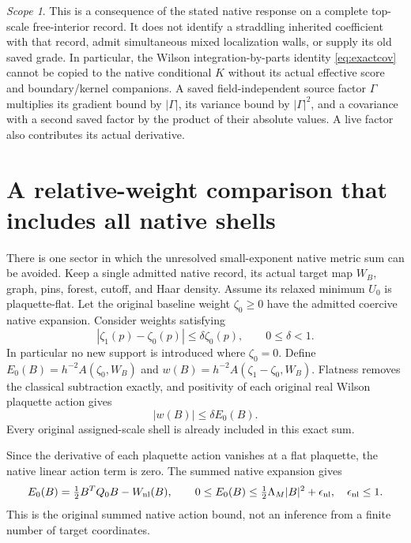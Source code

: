 \documentclass[11pt,letterpaper]{article}
\numberwithin{equation}{section}
\theoremstyle{plain}
\theoremstyle{remark}
\newtheorem{remark}[theorem]{Scope}
\begin{document}
\begin{remark}
This is a consequence of the stated native response on a complete top-scale
free-interior record. It does not identify a straddling inherited coefficient
with that record, admit simultaneous mixed localization walls, or supply its
old saved grade. In particular, the Wilson integration-by-parts identity
\eqref{eq:exactcov} cannot be copied to the native conditional $K$ without its
actual effective score and boundary/kernel companions. A saved
field-independent source factor $\Gamma$ multiplies its gradient bound by
$|\Gamma|$, its variance bound by $|\Gamma|^2$, and a covariance with a second
saved factor by the product of their absolute values. A live factor also
contributes its actual derivative.
\end{remark}

\section{A relative-weight comparison that includes all native shells}
\label{sec:flat}

There is one sector in which the unresolved small-exponent native metric sum
can be avoided. Keep a single admitted native record, its actual target map
$W_B$, graph, pins, forest, cutoff, and Haar density. Assume its relaxed
minimum $U_0$ is plaquette-flat. Let the original baseline weight $\zeta_0\ge0$
have the admitted coercive native expansion. Consider weights satisfying
\begin{equation}
 |\zeta_1(p)-\zeta_0(p)|\le\delta\zeta_0(p),\qquad0\le\delta<1.
 \label{eq:relativeweight}
\end{equation}
In particular no new support is introduced where $\zeta_0=0$.
Define $E_0(B)=h^{-2}A(\zeta_0,W_B)$ and
$w(B)=h^{-2}A(\zeta_1-\zeta_0,W_B)$. Flatness removes the classical subtraction
exactly, and positivity of each original real Wilson plaquette action gives
\begin{equation}
 |w(B)|\le\delta E_0(B).
 \label{eq:energyrelative}
\end{equation}
Every original assigned-scale shell is already included in this exact sum.

Since the derivative of each plaquette action vanishes at a flat plaquette,
the native linear action term is zero. The summed native expansion gives
\begin{equation}
 E_0(B)=\tfrac12B^TQ_0B-W_{\rm nl}(B),\qquad
 0\le E_0(B)\le\tfrac12\Lambda_M|B|^2+\epsilon_{\rm nl},
 \quad\epsilon_{\rm nl}\le1.
 \label{eq:flatE}
\end{equation}
This is the original summed native action bound, not an inference from a
finite number of target coordinates.
\end{document}
